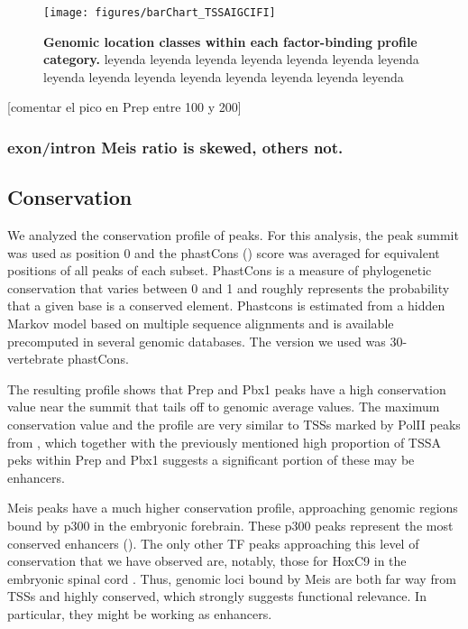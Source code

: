 \begin{figure}[]
  
  \centering
  \label{fig:distanceBarChart}
  \texttt{[image: figures/barChart\_TSSAIGCIFI]}
  \caption[Genomic location classes within each factor-binding profile category]{\textbf{Genomic location classes within each factor-binding profile category.} leyenda leyenda leyenda leyenda leyenda leyenda leyenda leyenda leyenda leyenda leyenda leyenda leyenda leyenda leyenda}
\end{figure}

[comentar el pico en Prep entre 100 y 200]


\subsubsection{exon/intron Meis ratio is skewed, others not.}




\subsection{Conservation}

We analyzed the conservation profile of peaks. For this analysis, the peak summit was used as position 0 and the phastCons (\cite{Siepel2005}) score was averaged for equivalent positions of all peaks of each subset. PhastCons is a measure of phylogenetic conservation that varies between 0 and 1 and roughly represents the probability that a given base is a conserved element. Phastcons is estimated from a hidden Markov model based on multiple sequence alignments and is available precomputed in several genomic databases. The version we used was 30-vertebrate phastCons.

The resulting profile shows that Prep and Pbx1 peaks have a high conservation value near the summit that tails off to genomic average values. The maximum conservation value and the profile are very similar to \acp{TSS} marked by \ac{PolII} peaks from \cite{Mahony2011}, which together with the previously mentioned high proportion of \ac{TSSA} peks within Prep and Pbx1 suggests a significant portion of these may be enhancers.

Meis peaks have a much higher conservation profile, approaching genomic regions bound by p300 in the embryonic forebrain. These p300 peaks represent the most conserved enhancers (\cite{Blow2010}). The only other \ac{TF} peaks approaching this level of conservation that we have observed are, notably, those for HoxC9 in the embryonic spinal cord \cite{Jung2010}. Thus, genomic loci bound by Meis are both far way from \acp{TSS} and highly conserved, which strongly suggests functional relevance. In particular, they might be working as enhancers.

